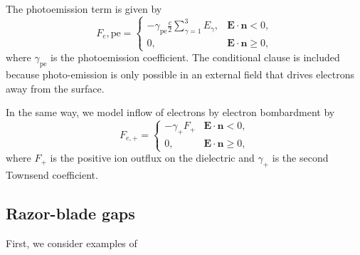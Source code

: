 \documentclass[3p]{elsarticle}
\begin{document}
The photoemission term is given by
\begin{equation}
  F_e, {\text{pe}} = \begin{cases}
    -\gamma_{\text{pe}}\frac{c}{2}\sum_{\gamma = 1}^3 E_\gamma, & \bm{E}\cdot\bm{n} < 0,\\
    0, & \bm{E}\cdot\bm{n} \geq 0,
  \end{cases}
\end{equation}
where $\gamma_{\text{pe}}$ is the photoemission coefficient. The conditional clause is included because photo-emission is only possible in an external field that drives electrons away from the surface. 

In the same way, we model inflow of electrons by electron bombardment by
\begin{equation}
  F_{e, +} = \begin{cases}
    -\gamma_+F_+ & \bm{E}\cdot\bm{n} < 0,\\
    0, & \bm{E}\cdot\bm{n} \geq 0,
  \end{cases}
\end{equation}
where $F_+$ is the positive ion outflux on the dielectric and $\gamma_+$ is the second Townsend coefficient.

\subsection{Razor-blade gaps}
First, we consider examples of 
\end{document}
